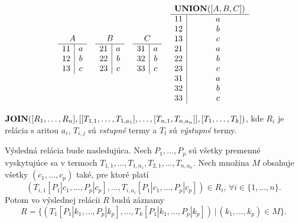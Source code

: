     \begin{priklad}
    \begin{center}
        \[
    \begin{array}{c c c c}
        \begin{array}{c|c}
        \multicolumn{2}{c}{A} \\ \hline
        11 & a \\
        12 & b \\
        13 & c
        \end{array}
        &
        \begin{array}{c|c}
        \multicolumn{2}{c}{B} \\ \hline
        21 & a \\
        22 & b \\
        23 & c
        \end{array}
        &
        \begin{array}{c|c}
        \multicolumn{2}{c}{C} \\ \hline
        31 & a \\
        32 & b \\
        33 & c
        \end{array}
        &
        \begin{array}{c|c}
        \multicolumn{2}{c}{\UNION([A, B, C])} \\ \hline
        11 & a \\
        12 & b \\
        13 & c \\
        21 & a \\
        22 & b \\
        23 & c \\
        31 & a \\
        32 & b \\
        33 & c 
        \end{array}
    \end{array}
    \]
    \end{center}
    \end{priklad} 

\vline

$\textbf{JOIN}([R_1, \dots, R_n], [[T_{1, 1}, \dots, T_{1, a_1}], \dots, [T_{n, 1}, T_{n, a_n}]], [T_1,
\dots, T_k])$, kde $R_i$ je relácia s aritou $a_i$, $T_{i, j}$ sú \textit{vstupné} termy a $T_l$ sú
\textit{výstupné} termy.
    
Výsledná relácia bude nasledujúca. Nech $P_1, \dots, P_p$ sú všetky premenné vyskytujúce sa v
termoch $T_{1, 1}, \dots, T_{1, a_1}, T_{2, 1}, \dots, T_{n, a_n}$. Nech množina $M$ obsahuje všetky
$(c_1, \dots, c_p)$ také, pre ktoré platí 
$$(T_{i, 1}[P_1|c_1, \dots, P_p|c_p], \dots, T_{i, a_i}[P_1|c_1, \dots, P_p|c_p]) \in R_i, \,
\forall i \in \{1, \dots, n\}\text{.}$$ Potom vo výslednej relácii $R$ budú záznamy 
$$R = \{(T_1[P_1|k_1, \dots, P_p|k_p], \dots, T_k[P_1|k_1, \dots, P_p|k_p]) \, | \, (k_1, \dots,
k_p) \in M\} \text{.}$$
    
